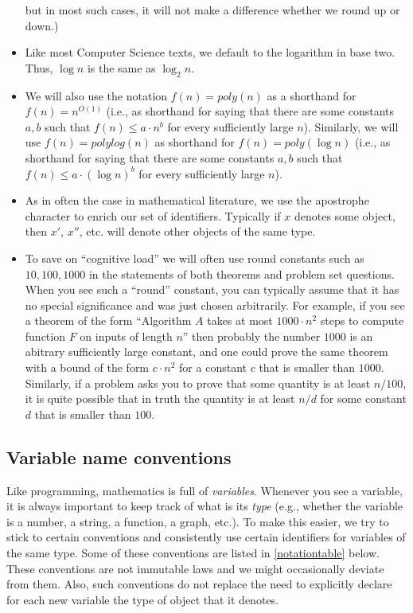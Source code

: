 \begin{itemize}
  but in most such cases, it will not make a difference whether we round
  up or down.)
\item
  Like most Computer Science texts, we default to the logarithm in base
  two. Thus, \(\log n\) is the same as \(\log_2 n\).
\item
  We will also use the notation \(f(n)=poly(n)\) as a shorthand for
  \(f(n)=n^{O(1)}\) (i.e., as shorthand for saying that there are some
  constants \(a,b\) such that \(f(n) \leq a\cdot n^b\) for every
  sufficiently large \(n\)). Similarly, we will use \(f(n)=polylog(n)\)
  as shorthand for \(f(n)=poly(\log n)\) (i.e., as shorthand for saying
  that there are some constants \(a,b\) such that
  \(f(n) \leq a\cdot (\log n)^b\) for every sufficiently large \(n\)).
\item
  As in often the case in mathematical literature, we use the apostrophe
  character to enrich our set of identifiers. Typically if \(x\) denotes
  some object, then \(x'\), \(x''\), etc. will denote other objects of
  the same type.
\item
  To save on ``cognitive load'' we will often use round constants such
  as \(10,100,1000\) in the statements of both theorems and problem set
  questions. When you see such a ``round'' constant, you can typically
  assume that it has no special significance and was just chosen
  arbitrarily. For example, if you see a theorem of the form ``Algorithm
  \(A\) takes at most \(1000\cdot n^2\) steps to compute function \(F\)
  on inputs of length \(n\)'' then probably the number \(1000\) is an
  abitrary sufficiently large constant, and one could prove the same
  theorem with a bound of the form \(c \cdot n^2\) for a constant \(c\)
  that is smaller than \(1000\). Similarly, if a problem asks you to
  prove that some quantity is at least \(n/100\), it is quite possible
  that in truth the quantity is at least \(n/d\) for some constant \(d\)
  that is smaller than \(100\).
\end{itemize}

\subsection{Variable name conventions}\label{conventionsec}

Like programming, mathematics is full of \emph{variables}. Whenever you
see a variable, it is always important to keep track of what is its
\emph{type} (e.g., whether the variable is a number, a string, a
function, a graph, etc.). To make this easier, we try to stick to
certain conventions and consistently use certain identifiers for
variables of the same type. Some of these conventions are listed in
\cref{notationtable} below. These conventions are not immutable laws and
we might occasionally deviate from them. Also, such conventions do not
replace the need to explicitly declare for each new variable the type of
object that it denotes.

